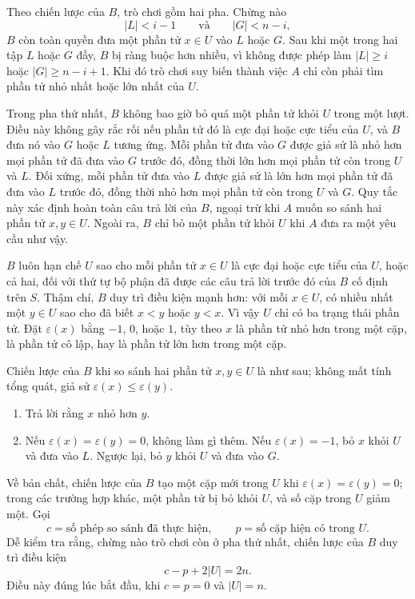 \documentclass[11pt]{article}
\begin{document}
Theo chiến lược của \(B\), trò chơi gồm hai pha. Chừng nào
\[
  |L|<i-1
  \qquad\text{và}\qquad
  |G|<n-i,
\]
\(B\) còn toàn quyền đưa một phần tử \(x\in U\) vào \(L\) hoặc \(G\). Sau khi
một trong hai tập \(L\) hoặc \(G\) đầy, \(B\) bị ràng buộc hơn nhiều, vì không
được phép làm \(|L|\ge i\) hoặc \(|G|\ge n-i+1\). Khi đó trò chơi suy biến
thành việc \(A\) chỉ còn phải tìm phần tử nhỏ nhất hoặc lớn nhất của \(U\).

Trong pha thứ nhất, \(B\) không bao giờ bỏ quá một phần tử khỏi \(U\) trong
một lượt. Điều này không gây rắc rối nếu phần tử đó là cực đại hoặc cực tiểu
của \(U\), và \(B\) đưa nó vào \(G\) hoặc \(L\) tương ứng. Mỗi phần tử đưa vào
\(G\) được giả sử là nhỏ hơn mọi phần tử đã đưa vào \(G\) trước đó, đồng thời
lớn hơn mọi phần tử còn trong \(U\) và \(L\). Đối xứng, mỗi phần tử đưa vào
\(L\) được giả sử là lớn hơn mọi phần tử đã đưa vào \(L\) trước đó, đồng thời
nhỏ hơn mọi phần tử còn trong \(U\) và \(G\). Quy tắc này xác định hoàn toàn
câu trả lời của \(B\), ngoại trừ khi \(A\) muốn so sánh hai phần tử
\(x,y\in U\). Ngoài ra, \(B\) chỉ bỏ một phần tử khỏi \(U\) khi \(A\) đưa ra
một yêu cầu như vậy.

\(B\) luôn hạn chế \(U\) sao cho mỗi phần tử \(x\in U\) là cực đại hoặc cực
tiểu của \(U\), hoặc cả hai, đối với thứ tự bộ phận đã được các câu trả lời
trước đó của \(B\) cố định trên \(S\). Thậm chí, \(B\) duy trì điều kiện mạnh
hơn: với mỗi \(x\in U\), có nhiều nhất một \(y\in U\) sao cho đã biết
\(x<y\) hoặc \(y<x\). Vì vậy \(U\) chỉ có ba trạng thái phần tử. Đặt
\(\varepsilon(x)\) bằng \(-1\), \(0\), hoặc \(1\), tùy theo \(x\) là phần tử
nhỏ hơn trong một cặp, là phần tử cô lập, hay là phần tử lớn hơn trong một
cặp.

Chiến lược của \(B\) khi so sánh hai phần tử \(x,y\in U\) là như sau; không
mất tính tổng quát, giả sử \(\varepsilon(x)\le\varepsilon(y)\).

\begin{enumerate}
  \item Trả lời rằng \(x\) nhỏ hơn \(y\).
  \item Nếu \(\varepsilon(x)=\varepsilon(y)=0\), không làm gì thêm. Nếu
  \(\varepsilon(x)=-1\), bỏ \(x\) khỏi \(U\) và đưa vào \(L\). Ngược lại, bỏ
  \(y\) khỏi \(U\) và đưa vào \(G\).
\end{enumerate}

Về bản chất, chiến lược của \(B\) tạo một cặp mới trong \(U\) khi
\(\varepsilon(x)=\varepsilon(y)=0\); trong các trường hợp khác, một phần tử bị
bỏ khỏi \(U\), và số cặp trong \(U\) giảm một. Gọi
\[
  c=\text{số phép so sánh đã thực hiện},\qquad
  p=\text{số cặp hiện có trong }U.
\]
Dễ kiểm tra rằng, chừng nào trò chơi còn ở pha thứ nhất, chiến lược của \(B\)
duy trì điều kiện
\[
  c-p+2|U|=2n.
  \tag{21}
\]
Điều này đúng lúc bắt đầu, khi \(c=p=0\) và \(|U|=n\).
\end{document}
